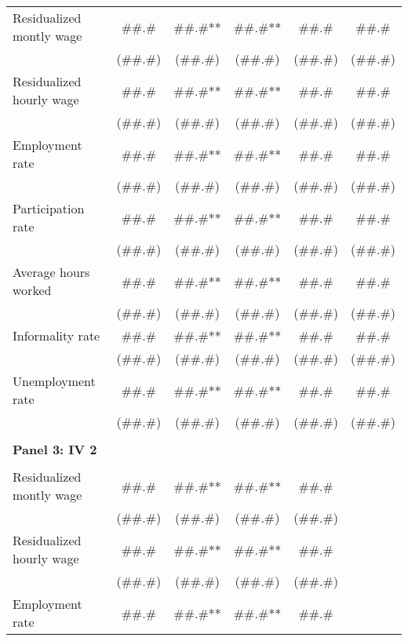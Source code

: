\begin{tabular}{rccccc}
\multicolumn{1}{l}{Residualized montly wage} & \#\#.\# & \#\#.\#** & \#\#.\#** & \#\#.\# & \#\#.\# \\
      & (\#\#.\#) & (\#\#.\#) & (\#\#.\#) & (\#\#.\#) & (\#\#.\#) \\
\multicolumn{1}{l}{Residualized hourly wage} & \#\#.\# & \#\#.\#** & \#\#.\#** & \#\#.\# & \#\#.\# \\
      & (\#\#.\#) & (\#\#.\#) & (\#\#.\#) & (\#\#.\#) & (\#\#.\#) \\
\multicolumn{1}{l}{Employment rate} & \#\#.\# & \#\#.\#** & \#\#.\#** & \#\#.\# & \#\#.\# \\
      & (\#\#.\#) & (\#\#.\#) & (\#\#.\#) & (\#\#.\#) & (\#\#.\#) \\
\multicolumn{1}{l}{Participation rate} & \#\#.\# & \#\#.\#** & \#\#.\#** & \#\#.\# & \#\#.\# \\
      & (\#\#.\#) & (\#\#.\#) & (\#\#.\#) & (\#\#.\#) & (\#\#.\#) \\
\multicolumn{1}{l}{Average hours worked} & \#\#.\# & \#\#.\#** & \#\#.\#** & \#\#.\# & \#\#.\# \\
      & (\#\#.\#) & (\#\#.\#) & (\#\#.\#) & (\#\#.\#) & (\#\#.\#) \\
\multicolumn{1}{l}{Informality rate} & \#\#.\# & \#\#.\#** & \#\#.\#** & \#\#.\# & \#\#.\# \\
      & (\#\#.\#) & (\#\#.\#) & (\#\#.\#) & (\#\#.\#) & (\#\#.\#) \\
\multicolumn{1}{l}{Unemployment rate} & \#\#.\# & \#\#.\#** & \#\#.\#** & \#\#.\# & \#\#.\# \\
      & (\#\#.\#) & (\#\#.\#) & (\#\#.\#) & (\#\#.\#) & (\#\#.\#) \\
      &       &       &       &       &  \\
\multicolumn{1}{l}{\textbf{Panel 3: IV 2}} &       &       &       &       &  \\
      &       &       &       &       &  \\
\multicolumn{1}{l}{Residualized montly wage} & \#\#.\# & \#\#.\#** & \#\#.\#** & \#\#.\# &  \\
      & (\#\#.\#) & (\#\#.\#) & (\#\#.\#) & (\#\#.\#) &  \\
\multicolumn{1}{l}{Residualized hourly wage} & \#\#.\# & \#\#.\#** & \#\#.\#** & \#\#.\# &  \\
      & (\#\#.\#) & (\#\#.\#) & (\#\#.\#) & (\#\#.\#) &  \\
\multicolumn{1}{l}{Employment rate} & \#\#.\# & \#\#.\#** & \#\#.\#** & \#\#.\# &  \\

\end{tabular}
